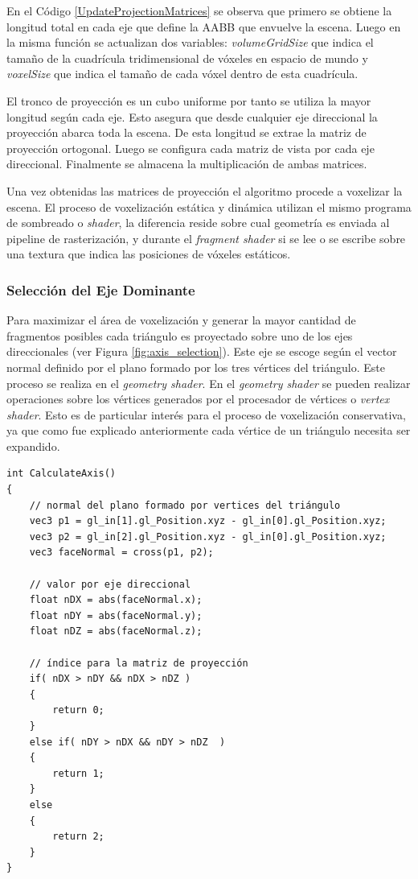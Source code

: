 En el Código \ref{UpdateProjectionMatrices} se observa que primero se obtiene la longitud total en cada eje que define la \ac{AABB} que envuelve la escena. Luego en la misma función se actualizan dos variables: \emph{volumeGridSize} que indica el tamaño de la cuadrícula tridimensional de vóxeles en espacio de mundo y \emph{voxelSize} que indica el tamaño de cada vóxel dentro de esta cuadrícula. 

El tronco de proyección es un cubo uniforme por tanto se utiliza la mayor longitud según cada eje. Esto asegura que desde cualquier eje direccional la proyección abarca toda la escena. De esta longitud se extrae la matriz de proyección ortogonal. Luego se configura cada matriz de vista por cada eje direccional. Finalmente se almacena la multiplicación de ambas matrices.

Una vez obtenidas las matrices de proyección el algoritmo procede a voxelizar la escena. El proceso de voxelización estática y dinámica utilizan el mismo programa de sombreado o \emph{shader}, la diferencia reside sobre cual geometría es enviada al pipeline de rasterización, y durante el \emph{fragment shader} si se lee o se escribe sobre una textura que indica las posiciones de vóxeles estáticos.

\subsubsection{Selección del Eje Dominante}
Para maximizar el área de voxelización y generar la mayor cantidad de fragmentos posibles cada triángulo es proyectado sobre uno de los ejes direccionales (ver Figura \ref{fig:axis_selection}). Este eje se escoge según el vector normal definido por el plano formado por los tres vértices del triángulo. Este proceso se realiza en el \emph{geometry shader}. En el \emph{geometry shader} se pueden realizar operaciones sobre los vértices generados por el procesador de vértices o \emph{vertex shader}. Esto es de particular interés para el proceso de voxelización conservativa, ya que como fue explicado anteriormente cada vértice de un triángulo necesita ser expandido.
\\
\begin{lstlisting}[caption={Selección del eje dominante para la proyección ortogonal.}, label=CalculateAxis]
int CalculateAxis()
{
    // normal del plano formado por vertices del triángulo
    vec3 p1 = gl_in[1].gl_Position.xyz - gl_in[0].gl_Position.xyz;
    vec3 p2 = gl_in[2].gl_Position.xyz - gl_in[0].gl_Position.xyz;
    vec3 faceNormal = cross(p1, p2);

    // valor por eje direccional
    float nDX = abs(faceNormal.x);
    float nDY = abs(faceNormal.y);
    float nDZ = abs(faceNormal.z);

    // índice para la matriz de proyección
    if( nDX > nDY && nDX > nDZ )
    {
        return 0;
    }
    else if( nDY > nDX && nDY > nDZ  )
    {
        return 1;
    }
    else
    {
        return 2;
    }
}
\end{lstlisting}

